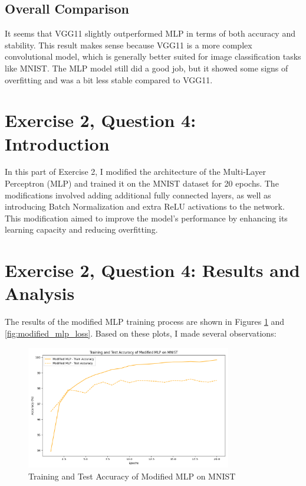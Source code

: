 \documentclass[10pt,letter,notitlepage]{article}
\begin{document}
\begin{center}
\subsection{Overall Comparison}
It seems that VGG11 slightly outperformed MLP in terms of both accuracy and stability. This result makes sense because VGG11 is a more complex convolutional model, which is generally better suited for image classification tasks like MNIST. The MLP model still did a good job, but it showed some signs of overfitting and was a bit less stable compared to VGG11.

\section{Exercise 2, Question 4: Introduction}
In this part of Exercise 2, I modified the architecture of the Multi-Layer Perceptron (MLP) and trained it on the MNIST dataset for 20 epochs. The modifications involved adding additional fully connected layers, as well as introducing Batch Normalization and extra ReLU activations to the network. This modification aimed to improve the model's performance by enhancing its learning capacity and reducing overfitting.

\section{Exercise 2, Question 4: Results and Analysis}
The results of the modified MLP training process are shown in Figures \ref{fig:modified_mlp_accuracy} and \ref{fig:modified_mlp_loss}. Based on these plots, I made several observations:

\begin{figure}[h]
    \centering
    \includegraphics[width=0.8\textwidth]{modified_mlp_accuracy.png}
    \caption{Training and Test Accuracy of Modified MLP on MNIST}
    \label{fig:modified_mlp_accuracy}
\end{figure}


\end{center}
\end{document}
